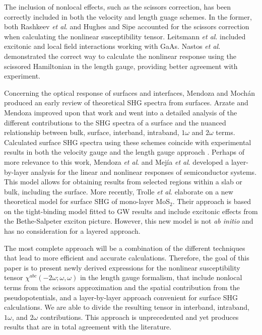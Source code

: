 The inclusion of nonlocal effects, such as the scissors correction, has been
correctly included in both the velocity and length guage schemes. 
In the former, both 
Rashkeev \emph{et al}.\cite{rashkeevPRB98} and 
Hughes and Sipe\cite{hughesPRB96} 
accounted for the scissors correction when calculating the nonlinear 
susceptibility tensor.
Leitsmann \emph{et al}.\cite{leitsmannPRB05} 
included excitonic and local field interactions working with GaAs.
Nastos \emph{et al}.\cite{nastosPRB05} demonstrated the correct 
way to calculate the nonlinear response using the scissored Hamiltonian 
in the length gauge, providing better agreement with experiment. 

Concerning the optical response of surfaces and interfaces,
Mendoza and Moch\'an\cite{mendozaPRB96} produced an early review of 
theoretical SHG spectra from surfaces. 
Arzate and Mendoza\cite{arzatePRB01} improved upon that work and
went into a detailed analysis of the different contributions to the 
SHG spectra of a surface and the nuanced relationship between bulk, 
surface, interband, intraband, $1\omega$ and $2\omega$ terms. 
Calculated surface SHG spectra using these schemes coincide with experimental
results in both the velocity gauge
\cite{mendozaPRB01,mendozaPRL98,reiningPRB94} and the length gauge approach
\cite{sharmaPRB03}. 
Perhaps of more relevance to this work, 
Mendoza \emph{et al}.\cite{mendozaPRB06} and 
Mej\'ia \emph{et al}.\cite{mejiaRMF04} developed a layer-by-layer analysis for 
the linear and nonlinear responses of semiconductor systems. This model
allows for obtaining results from selected regions within a slab or bulk,
including the surface.
More recently, 
Trolle \emph{et al}.\cite{trollePRB14} 
elaborate on a new theoretical model for surface SHG of 
mono-layer MoS$_{2}$. Their approach is based on the tight-binding model 
fitted to GW results and include excitonic effects from the 
Bethe-Salpeter exciton picture. However, this new model is not 
\emph{ab initio} and has no consideration for a layered approach.

The most complete approach will be a combination of the different techniques 
that lead to more efficient and accurate calculations. Therefore,
the goal of this paper is to present newly derived expressions for the 
nonlinear susceptibility tensor $\chi^{abc}(-2\omega;\omega,\omega)$ 
in the length gauge formalism, 
that include nonlocal terms from the scissors approximation 
and the spatial contribution from the pseudopotentials, and a 
layer-by-layer approach convenient for surface SHG calculations. We are
able to divide the resulting tensor in interband, intraband, $1\omega$, and 
$2\omega$ contributions. This approach is unprecedented and yet produces 
results that are in total agreement with the literature.

